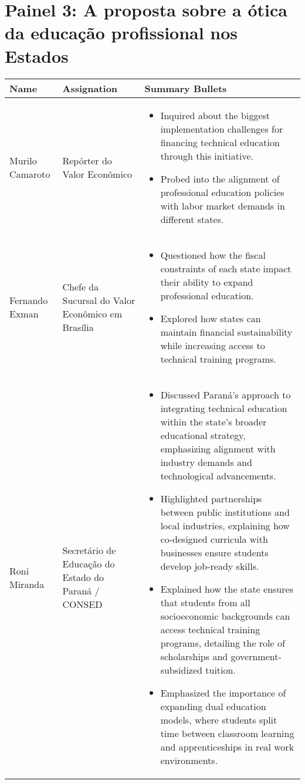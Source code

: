 \documentclass[a4paper,10pt]{article}
\begin{document}
\section*{Painel 3: A proposta sobre a ótica da educação profissional nos Estados}

\begin{table}[htbp!]
\centering
\renewcommand{\arraystretch}{1.2}
\begin{tabular}{|p{1in}|p{1in}|p{4.6in}|}
\hline
Name & Assignation & Summary Bullets \\
\hline
Murilo Camaroto & Repórter do Valor Econômico & \begin{itemize}
\item Inquired about the biggest implementation challenges for financing technical education through this initiative.
\item Probed into the alignment of professional education policies with labor market demands in different states.
\end{itemize}\\
\hline
Fernando Exman & Chefe da Sucursal do Valor Econômico em Brasília & \begin{itemize}
\item Questioned how the fiscal constraints of each state impact their ability to expand professional education.
\item Explored how states can maintain financial sustainability while increasing access to technical training programs.
\end{itemize}\\
\hline
Roni Miranda & Secretário de Educação do Estado do Paraná / CONSED & \begin{itemize}
\item Discussed Paraná’s approach to integrating technical education within the state's broader educational strategy, emphasizing alignment with industry demands and technological advancements.
\item Highlighted partnerships between public institutions and local industries, explaining how co-designed curricula with businesses ensure students develop job-ready skills.
\item Explained how the state ensures that students from all socioeconomic backgrounds can access technical training programs, detailing the role of scholarships and government-subsidized tuition.
\item Emphasized the importance of expanding dual education models, where students split time between classroom learning and apprenticeships in real work environments.

\end{itemize}
\end{tabular}
\end{table}
\end{document}
